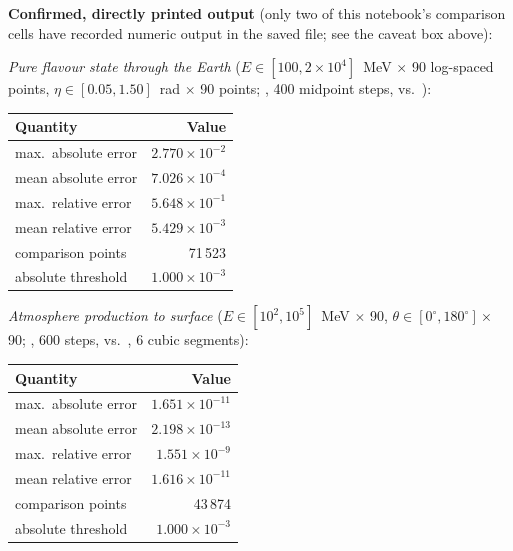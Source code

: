 \begin{resultbox}
\textbf{Confirmed, directly printed output} (only two of this notebook's
comparison cells have recorded numeric output in the saved file; see the
caveat box above):

\emph{Pure flavour state through the Earth}
($E\in[100,2\times10^4]$~MeV $\times$ 90 log-spaced points,
$\eta\in[0.05,1.50]$~rad $\times$ 90 points; ,
400 midpoint steps, vs.\ ):
\begin{center}
\small
\begin{tabular}{@{}lr@{}}
\toprule
Quantity & Value \\
\midrule
max.\ absolute error & $2.770\times10^{-2}$ \\
mean absolute error & $7.026\times10^{-4}$ \\
max.\ relative error & $5.648\times10^{-1}$ \\
mean relative error & $5.429\times10^{-3}$ \\
comparison points & 71\,523 \\
absolute threshold & $1.000\times10^{-3}$ \\
\bottomrule
\end{tabular}
\end{center}

\emph{Atmosphere production to surface}
($E\in[10^2,10^5]$~MeV $\times$ 90, $\theta\in[0^\circ,180^\circ]\times$90;
, 600 steps, vs.\ , 6
cubic segments):
\begin{center}
\small
\begin{tabular}{@{}lr@{}}
\toprule
Quantity & Value \\
\midrule
max.\ absolute error & $1.651\times10^{-11}$ \\
mean absolute error & $2.198\times10^{-13}$ \\
max.\ relative error & $1.551\times10^{-9}$ \\
mean relative error & $1.616\times10^{-11}$ \\
comparison points & 43\,874 \\
absolute threshold & $1.000\times10^{-3}$ \\
\bottomrule
\end{tabular}
\end{center}
\end{resultbox}


